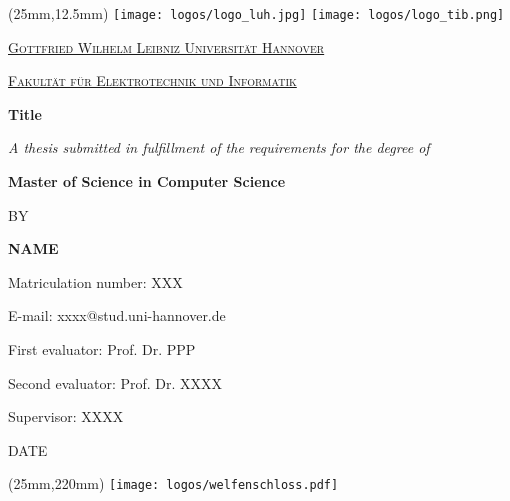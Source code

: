 
\begin{titlepage}
    \centering
    \begin{textblock*}{165mm}(25mm,12.5mm)
        \texttt{[image: logos/logo\_luh.jpg]} \hfill \texttt{[image: logos/logo\_tib.png]}
    \end{textblock*}
    
    \vspace*{1.5em}
    
    {\scshape\Large \href{www.uni-hannover.de}{Gottfried Wilhelm Leibniz Universität Hannover}\par}
    {\scshape\large \href{www.et-inf.uni-hannover.de}{Fakultät für Elektrotechnik und Informatik}\par}
    
    \vfill
    
    {\LARGE\bfseries Title \par}
    
    \vfill
    
    {\textit{A thesis submitted in fulfillment of the requirements for the degree of}\par}
    {\textbf{Master of Science in Computer Science}\par}
    
    \vspace*{2em}
    {BY\par}
    \vspace*{2em}
    
    {\bfseries\large NAME\par}
    {Matriculation number: XXX\par}
    {E-mail: xxxx@stud.uni-hannover.de\par}
    
    \vspace*{2.5em}
    
    {First evaluator: Prof. Dr. PPP\par}
    {Second evaluator: Prof. Dr. XXXX\par}
    {Supervisor: XXXX}
    
    \vfill
    
    {\Large DATE}
    
    \vspace*{2.5cm}
    
    \begin{textblock*}{165mm}(25mm,220mm)
        \texttt{[image: logos/welfenschloss.pdf]}
    \end{textblock*}
\end{titlepage}

\clearpage
\restoregeometry